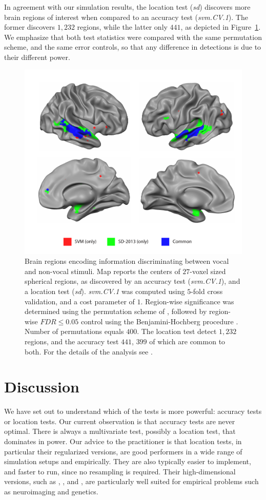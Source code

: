 \documentclass[12pt,a4paper]{article}
\begin{document}
In agreement with our simulation results, the location test (\emph{sd}) discovers more brain regions of interest when compared to an accuracy test (\emph{svm.CV.1}).
The former discovers $1,232$ regions, while the latter only $441$, as depicted in Figure~\ref{fig:read_data}.
We emphasize that both test statistics were compared with the same permutation scheme, and the same error controls, so that any difference in detections is due to their different power.


\begin{figure}[th]
\centering
\includegraphics[width=0.5\linewidth]{"art/svm_vs_SD"}
\caption{\footnotesize
Brain regions encoding information discriminating between vocal and non-vocal stimuli.
Map reports the centers of $27$-voxel sized spherical regions, as discovered by an accuracy test (\emph{svm.CV.1}), and a location test (\emph{sd}). 
\emph{svm.CV.1} was computed using $5$-fold cross validation, and a cost parameter of $1$. 
Region-wise significance was determined using the permutation scheme of \cite{stelzer_statistical_2013}, followed by region-wise $FDR \leq 0.05$ control using the Benjamini-Hochberg procedure \citep{benjamini_controlling_1995}.
Number of permutations equals $400$.
The location test detect $1,232$ regions, and the accuracy test $441$, $399$ of which are common to both.
For the details of the analysis see \cite{gilron_quantifying_2016}.  
  }
\label{fig:read_data}
\end{figure}








\section{Discussion}
\label{sec:discussion}

We have set out to understand which of the tests is more powerful: accuracy tests or location tests. 
Our current observation is that accuracy tests are never optimal.
There is always a multivariate test, possibly a location test, that dominates in power. 
Our advice to the practitioner is that location tests, in particular their regularized versions, are good performers in a wide range of simulation setups and empirically. 
They are also typically easier to implement, and faster to run, since no resampling is required. 
Their high-dimensional versions, such as \cite{schafer_shrinkage_2005}, \cite{goeman2006testing}, and \cite{srivastava_multivariate_2007}, are particularly well suited for empirical problems such as neuroimaging and genetics.
\end{document}
